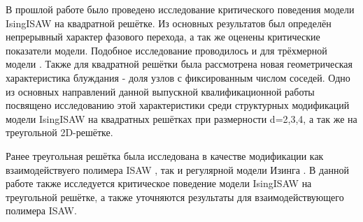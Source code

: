В прошлой работе \cite{faizullina2021critical} было проведено исследование критического поведения модели IsingISAW на квадратной решётке.
Из основных результатов был определён непрерывный характер фазового перехода, а так же оценены критические показатели модели.
Подобное исследование проводилось и для трёхмерной модели \cite{foster2021critical}.
Также для квадратной решётки была рассмотрена новая геометрическая характеристика блуждания - доля узлов с фиксированным числом соседей. 
Одно из основных направлений данной выпускной квалификационной работы посвящено исследованию этой характеристики среди 
структурных модификаций модели IsingISAW на квадратных решётках при размерности d=2,3,4, а так же на треугольной 2D-решётке.

Ранее треугольная решётка была исследована в качестве модификации как взаимодействуего полимера ISAW \cite{Privman1986}, 
так и регулярной модели Изинга \cite{ShchurTriangle, selke2006critical}. 
В данной работе также исследуется критическое поведение модели IsingISAW на треугольной решётке, а также уточняются результаты для взаимодействующего полимера ISAW.
